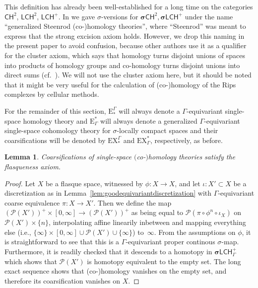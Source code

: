 \documentclass[pdftex]{sigma}
\numberwithin{equation}{section}
\newtheorem{lem}[thm]{Lemma}
\theoremstyle{definition}
\newcommand{\cP}{\mathcal{P}}
\newcommand{\categoryfont}[1]{\mathsf{#1}}
\newcommand{\sLCHp}[1][\Gamma]{\boldsymbol\sigma\categoryfont{LCH}_{#1}^+}
\newcommand{\sCHz}[1][\Gamma]{\boldsymbol\sigma\categoryfont{CH}_{#1}^2}
\newcommand{\LCHz}[1][\Gamma]{\categoryfont{LCH}_{#1}^2}
\newcommand{\LCHp}[1][\Gamma]{\categoryfont{LCH}_{#1}^+}
\newcommand{\CHz}[1][\Gamma]{\categoryfont{CH}_{#1}^2}
\newcommand{\Homol}{\mathrm{E}}
\newcommand{\Cohom}{\mathrm{E}}
\newcommand{\HomolX}{\mathrm{EX}}
\newcommand{\CohomX}{\mathrm{EX}}
\begin{document}
This definition has already been well-established for a long time on the categories $\CHz[]$, $\LCHz[]$, $\LCHp[]$. In \cite[Definition 4.13]{EngelWulff} we gave $\sigma$-versions for $\sCHz[],\sLCHp[]$ under the name ``generalized Steenrod \mbox{(co-)}homology theories'', where ``Steenrod'' was meant to express that the strong excision axiom holds. However, we drop this naming in the present paper to avoid confusion, because other authors use it as a qualifier for the cluster axiom, which says that homology turns disjoint unions of spaces into products of homology groups and co-homology turns disjoint unions into direct sums (cf.\ \cite[Definition B.2.2]{WillettYuHigherIndexTheory}).
We will not use the cluster axiom here, but it should be noted that it might be very useful for the calculation of \mbox{(co-)}homology of the Rips complexes by cellular methods.



For the remainder of this section, $\Homol^\Gamma_*$ will always denote a $\Gamma$-equivariant single-space homology theory and $\Cohom_\Gamma^*$ will always denote a generalized $\Gamma$-equivariant single-space cohomology theory for $\sigma$-locally compact spaces and their coarsifications will be denoted by $\HomolX^\Gamma_*$ and $\CohomX_\Gamma^*$, respectively, as before.


\begin{lem}
\label{lem:SteenrodFlasqueness}
Coarsifications of single-space \mbox{$($co-$)$}homology theories satisfy the flasqueness axiom.
\end{lem}

\begin{proof}
Let $X$ be a flasque space, witnessed by $\phi\colon X\to X$, and let $\iota\colon X'\subset X$ be a discretization as in Lemma~\ref{lem:goodequivariantdiscretization} with $\Gamma$-equivariant coarse equivalence $\pi\colon X\to X'$. Then we define the map $(\cP(X'))^+\times[0,\infty]\to (\cP(X'))^+$ as being equal to $\cP(\pi\circ\phi^n\circ\iota_X)$ on $\cP(X')\times\{n\}$, interpolating affine linearily inbetween and mapping everything else (i.e., $\{\infty\}\times [0,\infty]\cup\cP(X')\cup\{\infty\}$) to~$\infty$. From the assumptions on $\phi$, it is straightforward to see that this is a $\Gamma$-equivariant proper continous $\sigma$-map. Furthermore, it is readily checked that it descends to a homotopy in $\sLCHp$ which shows that $\cP(X')$ is homotopy equivalent to the empty set. The long exact sequence shows that \mbox{(co-)}homology vanishes on the empty set, and therefore its coarsification vanishes on $X$.
\end{proof}
\end{document}

